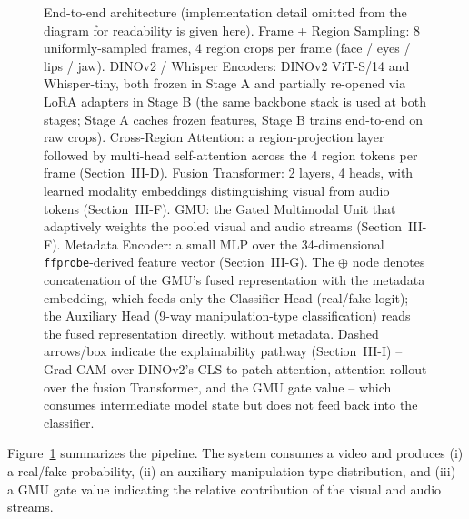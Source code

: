\documentclass[conference]{IEEEtran}
\begin{document}
\begin{figure}[t]
{%
}
\caption{End-to-end architecture (implementation detail omitted from the
diagram for readability is given here). Frame + Region Sampling: 8
uniformly-sampled frames, 4 region crops per frame (face / eyes / lips /
jaw). DINOv2 / Whisper Encoders: DINOv2 ViT-S/14 and Whisper-tiny, both
frozen in Stage A and partially re-opened via LoRA adapters in Stage B (the
same backbone stack is used at both stages; Stage A caches frozen features,
Stage B trains end-to-end on raw crops). Cross-Region Attention: a
region-projection layer followed by multi-head self-attention across the 4
region tokens per frame (Section~III-D). Fusion Transformer: 2 layers, 4
heads, with learned modality embeddings distinguishing visual from audio
tokens (Section~III-F). GMU: the Gated Multimodal Unit that adaptively
weights the pooled visual and audio streams (Section~III-F). Metadata
Encoder: a small MLP over the 34-dimensional \texttt{ffprobe}-derived
feature vector (Section~III-G). The $\oplus$ node denotes concatenation of
the GMU's fused representation with the metadata embedding, which feeds
only the Classifier Head (real/fake logit); the Auxiliary Head (9-way
manipulation-type classification) reads the fused representation directly,
without metadata. Dashed arrows/box indicate the explainability pathway
(Section~III-I) -- Grad-CAM over DINOv2's CLS-to-patch attention, attention
rollout over the fusion Transformer, and the GMU gate value -- which
consumes intermediate model state but does not feed back into the
classifier.}
\label{fig:architecture}
\end{figure}

Figure~\ref{fig:architecture} summarizes the pipeline. The system consumes a
video and produces (i) a real/fake probability, (ii) an auxiliary
manipulation-type distribution, and (iii) a GMU gate value indicating the
relative contribution of the visual and audio streams.
\end{document}
